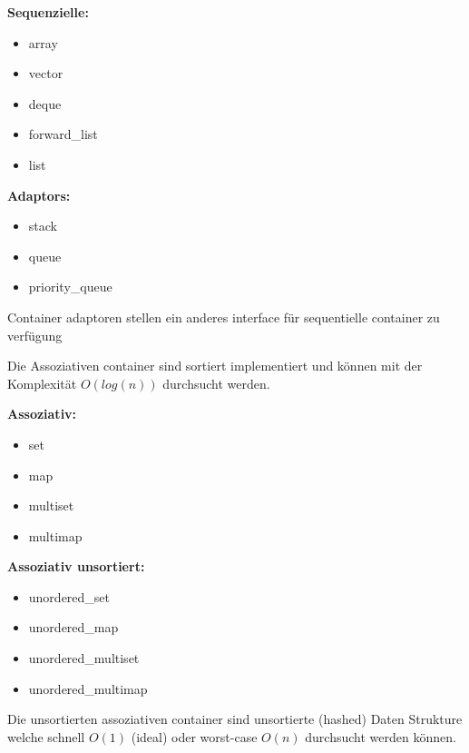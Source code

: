 \begin{multicols}{2}
	\textbf{Sequenzielle:}
	\begin{itemize}
		\item array
		\item vector
		\item deque
		\item forward\_list
		\item list
	\end{itemize}
	
	\textbf{Adaptors:}
	\begin{itemize}
		\item stack
		\item queue
		\item priority\_queue
	\end{itemize}
	
\end{multicols}
Container adaptoren stellen ein anderes interface für sequentielle container zu verfügung


Die Assoziativen container sind sortiert implementiert und können mit der Komplexität $O(log(n))$ durchsucht werden.
\begin{multicols}{2}
	\textbf{Assoziativ:}
	\begin{itemize}
		\item set
		\item map
		\item multiset
		\item multimap
	\end{itemize}
	
	\textbf{Assoziativ unsortiert:}
	\begin{itemize}
		\item unordered\_set
		\item unordered\_map
		\item unordered\_multiset
		\item unordered\_multimap
	\end{itemize}
\end{multicols}
Die unsortierten assoziativen container sind unsortierte (hashed) Daten Strukture welche schnell $O(1)$ (ideal) oder worst-case $O(n)$ durchsucht werden können.

